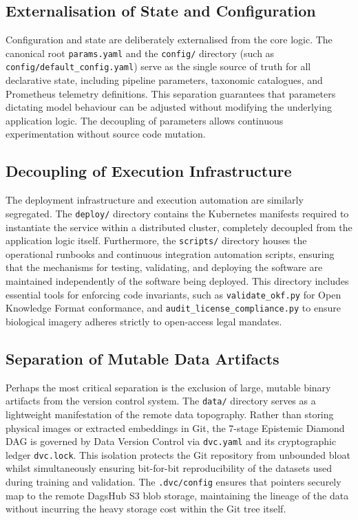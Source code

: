 \subsection{Externalisation of State and Configuration}
Configuration and state are deliberately externalised from the core logic. The canonical root \texttt{params.yaml} and the \texttt{config/} directory (such as \texttt{config/default\_config.yaml}) serve as the single source of truth for all declarative state, including pipeline parameters, taxonomic catalogues, and Prometheus telemetry definitions. This separation guarantees that parameters dictating model behaviour can be adjusted without modifying the underlying application logic. The decoupling of parameters allows continuous experimentation without source code mutation.

\subsection{Decoupling of Execution Infrastructure}
The deployment infrastructure and execution automation are similarly segregated. The \texttt{deploy/} directory contains the Kubernetes manifests required to instantiate the service within a distributed cluster, completely decoupled from the application logic itself. Furthermore, the \texttt{scripts/} directory houses the operational runbooks and continuous integration automation scripts, ensuring that the mechanisms for testing, validating, and deploying the software are maintained independently of the software being deployed. This directory includes essential tools for enforcing code invariants, such as \texttt{validate\_okf.py} for Open Knowledge Format conformance, and \texttt{audit\_license\_compliance.py} to ensure biological imagery adheres strictly to open-access legal mandates.

\subsection{Separation of Mutable Data Artifacts}
Perhaps the most critical separation is the exclusion of large, mutable binary artifacts from the version control system. The \texttt{data/} directory serves as a lightweight manifestation of the remote data topography. Rather than storing physical images or extracted embeddings in Git, the 7-stage Epistemic Diamond DAG is governed by Data Version Control via \texttt{dvc.yaml} and its cryptographic ledger \texttt{dvc.lock}. This isolation protects the Git repository from unbounded bloat whilst simultaneously ensuring bit-for-bit reproducibility of the datasets used during training and validation. The \texttt{.dvc/config} ensures that pointers securely map to the remote DagsHub S3 blob storage, maintaining the lineage of the data without incurring the heavy storage cost within the Git tree itself.

